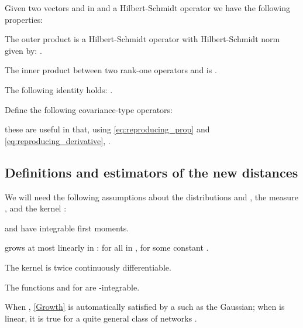 \documentclass{article}
\let\citep\parencite
\begin{document}
Given two vectors  and  in  and a Hilbert-Schmidt operator
 we have the following properties:
\begin{proplist}
  \item \label{HS_norm_rank_one}
    The outer product  is a Hilbert-Schmidt operator with Hilbert-Schmidt norm given by: .
  \item \label{HS_inner_rank_one}
    The inner product between two rank-one operators  and  is
    .
  \item \label{HS_inner_prod_rank_one}
    The following identity holds: .
\end{proplist}

Define the following covariance-type operators:

these are useful in that, using \eqref{eq:reproducing_prop} and \eqref{eq:reproducing_derivative},
.

\subsection{Definitions and estimators of the new distances} \label{sec:proofs:distances}

We will need the following assumptions about the distributions  and ,
the measure ,
and the kernel :
\begin{assumplist}
  \item \label{Moments}  and  have integrable first moments.
  \item \label{Growth}  grows at most linearly in : for all  in ,  for some constant .
  \item \label{Differentiability} The kernel  is twice continuously differentiable.
  \item \label{Integrability} The functions  and  for  are -integrable.
\end{assumplist}
When , \cref{Growth} is automatically satisfied by a  such as the Gaussian;
when  is linear, it is true for a quite general class of networks  \citep[Lemma 1]{Binkowski:2018}.
\end{document}
